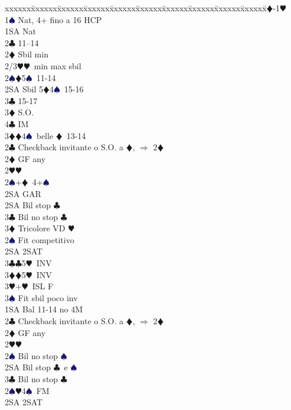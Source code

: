 \documentclass[a4paper,italian]{article}
\newcommand{\BC}{\textcolor{OliveGreen}{$\clubsuit$}}
\newcommand{\BD}{\textcolor{RedOrange}{$\vardiamondsuit$}}
\newcommand{\BH}{\textcolor{Red2}{$\varheartsuit${}}}
\newcommand{\BS}{\textcolor{MidnightBlue}{$\spadesuit${}}}
\newenvironment{bidtable}
{\begin{tabbing}

    xxxxxx\=xxxxxx\=xxxxxx\=xxxxxx\=xxxxxx\=xxxxxx\=xxxxxx\=xxxxxx\=xxxxxx\=xxxxxx\=\kill}
{\end{tabbing} }%
\begin{document}
\begin{multicols}{2}
    \begin{bidtable}
        1\BD-1\BH\+\\
        1\BS \> Nat, 4+ fino a 16 HCP\+\\
        1SA \> Nat\+\\
        2\BC {} 11--14\\
        2\BD \> Sbil min\\
        2/3\BH {}\BH\ min max sbil\\
        2\BS {}\BD 5\BS\ 11-14\\
        2SA \> Sbil 5\BD 4\BS\ 15-16\\
        3\BC {} 15-17\+\\
        3\BD \> S.O.\\
        4\BC \> IM\-\\
        3\BD {}\BD 4\BS\ belle \BD\ 13-14\-\\
        2\BC \> Checkback invitante o S.O. a \BD , $\Rightarrow$ 2\BD \\
        2\BD \> GF any\+\\
        2\BH {}\BH \\
        2\BS {}+\BD\ 4+\BS \+\\
        2SA \> GAR\-\\
        2SA \> Bil stop \BC \\
        3\BC \> Bil no stop \BC \\
        3\BD \> Tricolore VD \BH \-\\
        [2pt]2\BS \> Fit competitivo\\
        2SA \> 2SAT\\
        3\BC {}\BC 5\BH\ INV\\
        3\BD {}\BD 5\BH\ INV\\
        3\BH {}+\BH\ ISL F\\
        3\BS \> Fit sbil poco inv\-\\
        1SA \> Bal 11-14 no 4M\+\\
        2\BC \> Checkback invitante o S.O. a \BD , $\Rightarrow$ 2\BD \\
        2\BD \> GF any\+\\
        2\BH {}\BH \\
        2\BS \> Bil no stop \BS \\
        2SA \> Bil stop \BC\ e \BS \\
        3\BC \> Bil no stop \BC \-\\
        2\BS {}\BH 4\BS\ FM\\
        2SA \> 2SAT\\

\end{bidtable}
\end{multicols}
\end{document}
